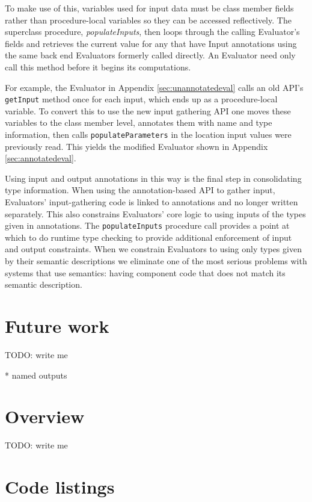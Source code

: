 \documentclass{article}
\begin{document}
To make use of this, variables used for input data must be class member fields rather than procedure-local variables so they can be accessed reflectively.
The superclass procedure, \emph{populateInputs}, then loops through the calling Evaluator's fields and retrieves the current value for any that have Input annotations using the same back end Evaluators formerly called directly.
An Evaluator need only call this method before it begins its computations.

For example, the Evaluator in Appendix \ref{sec:unannotatedeval} calls an old API's \texttt{getInput} method once for each input, which ends up as a procedure-local variable.
To convert this to use the new input gathering API one moves these variables to the class member level, annotates them with name and type information, then calls \texttt{populateParameters} in the location input values were previously read.
This yields the modified Evaluator shown in Appendix \ref{sec:annotatedeval}.

Using input and output annotations in this way is the final step in consolidating type information.
When using the annotation-based API to gather input, Evaluators' input-gathering code is linked to annotations and no longer written separately.
This also constrains Evaluators' core logic to using inputs of the types given in annotations.
The \texttt{populateInputs} procedure call provides a point at which to do runtime type checking to provide additional enforcement of input and output constraints.
When we constrain Evaluators to using only types given by their semantic descriptions we eliminate one of the most serious problems with systems that use semantics:  having component code that does not match its semantic description.

\section{Future work}

TODO:  write me

* named outputs

\section{Overview}

TODO:  write me

\clearpage
\appendix

\section{Code listings}
\end{document}
